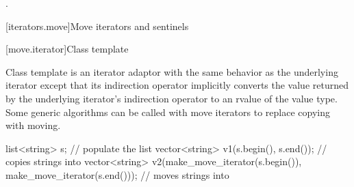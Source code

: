 \begin{itemdescr}
\pnum
\returns
{}.
\end{itemdescr}

[iterators.move]{Move iterators and sentinels}

[move.iterator]{Class template }

\pnum
Class template  is an iterator adaptor
with the same behavior as the underlying iterator except that its
indirection operator implicitly converts the value returned by the
underlying iterator's indirection operator to an rvalue
of the value type.
Some generic algorithms can be called with move iterators to replace
copying with moving.

\pnum
\enterexample

\begin{codeblock}
list<string> s;
// populate the list 
vector<string> v1(s.begin(), s.end());          // copies strings into 
vector<string> v2(make_move_iterator(s.begin()),
                  make_move_iterator(s.end())); // moves strings into 
\end{codeblock}

\exitexample


